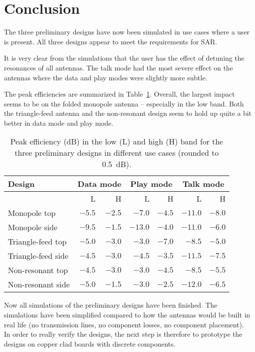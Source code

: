 \section{Conclusion}
The three preliminary designs have now been simulated in use cases where a user is present. All three designs appear to meet the requirements for SAR.

It is very clear from the simulations that the user has the effect of detuning the resonances of all antennas. The talk mode had the most severe effect on the antennas where the data and play modes were slightly more subtle.

The peak efficiencies are summarized in Table~\ref{tab:peakefficiencycomp}. Overall, the largest impact seems to be on the folded monopole antenna -- especially in the low band. Both the triangle-feed antenna and the non-resonant design seem to hold up quite a bit better in data mode and play mode.

\begin{table}[htbp]
    \centering
    \begin{tabular}{|l|r|r|r|r|r|r|}
        \hline
        Design             & \multicolumn{2}{c|}{Data mode}   & \multicolumn{2}{c|}{Play mode}   & \multicolumn{2}{c|}{Talk mode} \\
        \hline
         & L & H & L & H & L & H \\
        \hline
        Monopole top       & $-5.5$ & $-2.5$ & $-7.0 $  & $-4.5$ & $-11.0  $ & $-8.0$ \\
        Monopole side      & $-9.5$ & $-1.5$ & $-13.0 $ & $-4.0$ & $-11.0  $ & $-6.0$ \\
        \hline
        Triangle-feed top  & $-5.0$ & $-3.0$ & $-3.0  $ & $-7.0$ & $-8.5 $   & $-5.0$ \\
        Triangle-feed side & $-4.5$ & $-3.0$ & $-4.5$   & $-3.5$ & $-11.5$   & $-7.5$ \\
        \hline
        Non-resonant top   & $-4.5$ & $-3.0$ & $-3.0  $ & $-4.5$ & $-8.5 $   & $-5.5$ \\
        Non-resonant side  & $-5.0$ & $-1.5$ & $-3.0 $  & $-2.5$ & $-12.0  $ & $-6.5$ \\
        \hline
    \end{tabular}
    \caption{Peak efficiency (dB) in the low (L) and high (H) band for the three preliminary designs in different use cases (rounded to \SI{0.5}{dB}).}
    \label{tab:peakefficiencycomp}
\end{table}

Now all simulations of the preliminary designs have been finished. The simulations have been simplified compared to how the antennas would be built in real life (no transmission lines, no component losses, no component placement). In order to really verify the designs, the next step is therefore to prototype the designs on copper clad boards with discrete components.
